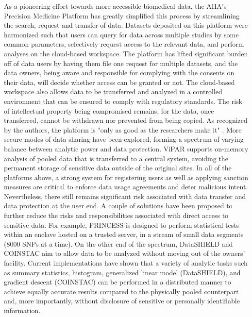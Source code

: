 \documentclass[letter]{bioinfo}
\begin{document}
	As a pioneering effort towards more accessible biomedical data, the AHA's Precision Medicine Platform \citep{Kass-Hout:2018:American} has greatly simplified this process by streamlining the search, request and transfer of data. Datasets deposited on this platform were harmonized such that users can query for data across multiple studies by some common parameters, selectively request access to the relevant data, and perform analyses on the cloud-based workspace. The platform has lifted significant burden off of data users by having them file one request for multiple datasets, and the data owners, being aware and responsible for complying with the consents on their data, will decide whether access can be granted or not. The cloud-based workspace also allows data to be transferred and analyzed in a controlled environment that can be ensured to comply with regulatory standards. The risk of intellectual property being compromised remains, for the data, once transferred, cannot be withdrawn nor prevented from being copied. As recognized by the authors, the platform is "only as good as the researchers make it" \citep{Kass-Hout:2018:American}.
	More secure modes of data sharing have been explored, forming a spectrum of varying balance between analytic power and data protection. ViPAR \citep{Carter:2016:ViPAR} supports on-memory analysis of pooled data that is transferred to a central system, avoiding the permanent storage of sensitive data outside of the original sites.  In all of the platforms above, a strong system for registering users as well as applying sanction measures are critical to enforce data usage agreements and deter malicious intent. Nevertheless, there still remains significant risk associated with data transfer and data protection at the user end.
	A couple of solutions have been proposed to further reduce the risks and responsibilities associated with direct access to sensitive data. For example, PRINCESS \citep{Chen:2017:PRINCESS} is designed to perform statistical tests within an enclave hosted on a trusted server, in a stream of small data segments (8000 SNPs at a time). On the other end of the spectrum, DataSHIELD \citep{Gaye:2014:DataSHIELD, Wilson:2017:DataSHIELD} and COINSTAC \citep{Plis:2016:COINSTAC} aim to allow data to be analyzed without moving out of the owners' facility. Current implementations have shown that a variety of analytic tasks such as summary statistics, histogram, generalized linear model (DataSHIELD), and gradient descent (COINSTAC) can be performed in a distributed manner to achieve equally accurate results compared to the physically pooled counterpart and, more importantly, without disclosure of sensitive or personally identifiable information.
	
\end{document}
